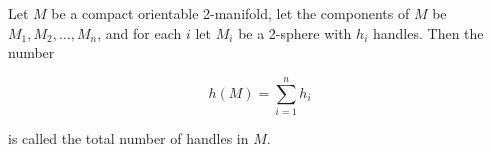 Let $M$ be a compact orientable 2-manifold, let the components of $M$ be $M_1, M_2, \ldots, M_n$, and for each $i$ let $M_i$ be a 2-sphere with $h_i$ handles. Then the number

$$h(M) = \sum_{i=1}^{n} h_i$$

is called the total number of handles in $M$.
